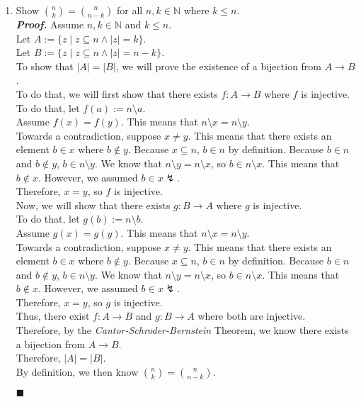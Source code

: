 \documentclass[11pt,a4paper]{article}
\begin{document}
\begin{enumerate}
\begin{enumerate}
        \item 
        Show $\binom{n}{k} = \binom{n}{n - k} $ for all $n, k \in \mathbb{N} $ where $k \leq n $. \\
        \emph{\textbf{Proof.}} Assume $n, k \in \mathbb{N} $ and $k \leq n$. \\
        Let $A := \{z \mid z \subseteq n \land |z| = k \} $. \\
        Let $B := \{z \mid z \subseteq n \land |z| = n - k \} $. \\
        To show that $|A| = |B| $, we will prove the existence of a bijection from $A \rightarrow B $.  \\
        To do that, we will first show that there exists $f: A \rightarrow B  $ where $f$ is injective. \\
        To do that, let $f(a) := n \setminus a $. \\
        Assume $f(x) = f(y) $. This means that $n \setminus x = n \setminus y $. \\ 
        Towards a contradiction, suppose $x \neq y $. This means that there exists an element $b \in x $ where $b \notin y $. Because $x \subseteq n $, $b \in n $ by definition. 
        Because $b \in n  $ and $b \notin y $, $b \in n \setminus y $. We know that $n \setminus y = n \setminus x $, so $b \in n \setminus x $. This means that $b \notin x $. However, we assumed $b \in x \lightning$. \\
        Therefore, $x = y $, so $f  $ is injective. \\
        Now, we will show that there exists $g: B \rightarrow A $ where $g$ is injective. \\
        To do that, let $g(b) := n \setminus b $. \\
        Assume $g(x) = g(y) $. This means that $n \setminus x = n \setminus y $. \\ 
        Towards a contradiction, suppose $x \neq y $. This means that there exists an element $b \in x $ where $b \notin y $. Because $x \subseteq n $, $b \in n $ by definition. 
        Because $b \in n  $ and $b \notin y $, $b \in n \setminus y $. We know that $n \setminus y = n \setminus x $, so $b \in n \setminus x $. This means that $b \notin x $. However, we assumed $b \in x \lightning$. \\
        Therefore, $x = y $, so $g  $ is injective. \\
        Thus, there exist $f: A \rightarrow B $ and $g: B \rightarrow A $ where both are injective. \\
        Therefore, by the \emph{Cantor-Schroder-Bernstein} Theorem, we know there exists a bijection from $A \rightarrow B $. \\
        Therefore, $|A| = |B| $. \\
        By definition, we then know  $\binom{n}{k} = \binom{n}{n - k} $.
        \begin{flushright}
            $\blacksquare$
        \end{flushright} 
        

\end{enumerate}
\end{enumerate}
\end{document}
